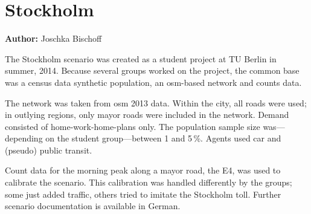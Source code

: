 \section{Stockholm}
\label{sec:stockholm}
\hfill \textbf{Author:} Joschka Bischoff


The Stockholm scenario was created as a student project at TU Berlin in summer, 2014. 
Because several groups worked on the project, the common base was a census data synthetic population, an \gls{osm}-based network and counts data.

The network was taken from \gls{osm} 2013 data. 
Within the city, all roads were used; in outlying regions, only mayor roads were included in the network. 
Demand consisted of home-work-home-plans only. 
The population sample size was---depending on the student group---between 1 and 5\,\%. Agents used car and (pseudo) public transit.

Count data for the morning peak along a mayor road, the E4, was used to calibrate the scenario. 
This calibration was handled differently by the groups; some just added traffic, others tried to imitate the Stockholm toll. 
Further scenario documentation is available in German. 

